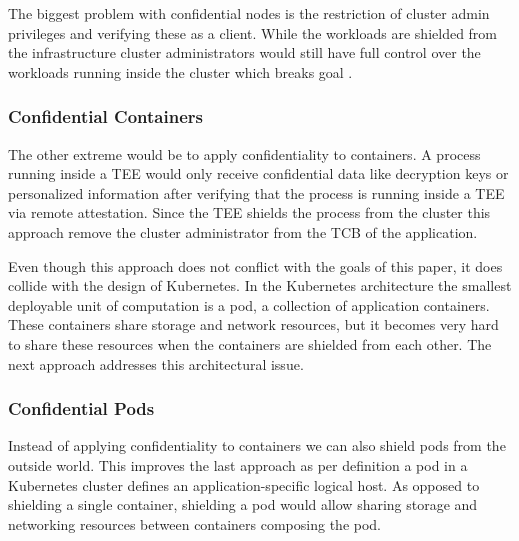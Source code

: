 The biggest problem with confidential nodes is the restriction of cluster admin
privileges and verifying these as a client. While the workloads are shielded
from the infrastructure cluster administrators would still have full control
over the workloads running inside the cluster which breaks goal
.

\subsubsection{Confidential Containers}

The other extreme would be to apply confidentiality to containers. A process
running inside a TEE would only receive confidential data like decryption keys
or personalized information after verifying that the process is running inside a
TEE via remote attestation. Since the TEE shields the process from the cluster
this approach remove the cluster administrator from the TCB of the application.

Even though this approach does not conflict with the goals of this paper, it does
collide with the design of Kubernetes. In the Kubernetes architecture the
smallest deployable unit of computation is a pod, a collection of application
containers. These containers share storage and network resources, but it becomes
very hard to share these resources when the containers are shielded from each
other. The next approach addresses this architectural issue.

\subsubsection{Confidential Pods}
\label{sec:confidential-applications}

Instead of applying confidentiality to containers we can also shield pods from
the outside world. This improves the last approach as per definition a pod in a
Kubernetes cluster defines an application-specific logical host. As opposed to
shielding a single container, shielding a pod would allow sharing storage and
networking resources between containers composing the pod.
